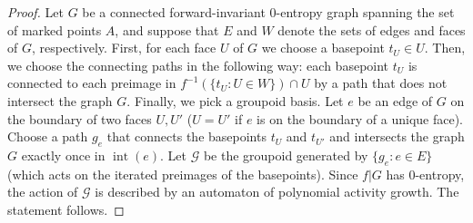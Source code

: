 \documentclass{amsart}
\theoremstyle{plain}
\theoremstyle{definition}
\theoremstyle{remark}
\newcommand{\reminder}[1]{\textsl{$\lhd\rhd$#1$\lhd\rhd$}\marginpar{$\lhd\rhd\lhd\rhd\lhd\rhd$}}%
\newcommand{\hide}[1]{}
\newcommand{\GC}{\mathcal{G}}
\newcommand{\intr}{{\operatorname{int}}}
\begin{document}
\begin{proof}
Let $G$ be a connected forward-invariant $0$-entropy graph spanning the set of marked points $A$, and suppose that $E$ and $W$ denote the sets of edges and faces of $G$, respectively. First, for each face $U$ of $G$ we choose a basepoint $t_U\in U$. Then, we choose the connecting paths in the following way: each basepoint $t_U$ is connected to each preimage in $f^{-1}(\{t_U\colon U\in W\})\cap U$ by a path that does not intersect the graph $G$. Finally, we pick a groupoid basis. Let $e$ be an edge of $G$ on the boundary of two faces $U,U'$ ($U=U'$ if $e$ is on the boundary of a unique face). Choose a path $g_e$ that connects the basepoints $t_U$ and $t_{U'}$ and intersects the graph $G$ exactly once in $\intr(e)$. Let $\GC$ be the groupoid generated by $\{g_e\colon e\in E\}$ (which acts on the iterated preimages of the basepoints). Since $f|G$ has $0$-entropy, the action of $\GC$ is described by an automaton of polynomial activity growth. The statement follows. 
\end{proof}




\end{document}
